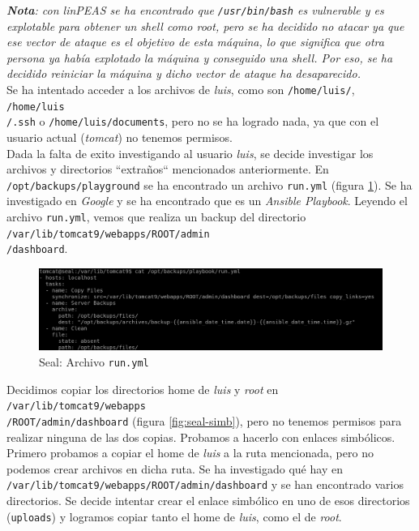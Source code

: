 \textit{\textbf{Nota}: con linPEAS se ha encontrado que \texttt{/usr/bin/bash} es vulnerable y es explotable para obtener un shell como root, pero se ha decidido no atacar ya que ese vector de ataque es el objetivo de esta máquina, lo que significa que otra persona ya había explotado la máquina y conseguido una shell. Por eso, se ha decidido reiniciar la máquina y dicho vector de ataque ha desaparecido.}\\

Se ha intentado acceder a los archivos de \textit{luis}, como son \texttt{/home/luis/}, \texttt{/home/luis\\/.ssh} o \texttt{/home/luis/documents}, pero no se ha logrado nada, ya que con el usuario actual (\textit{tomcat}) no tenemos permisos.\\

Dada la falta de exito investigando al usuario \textit{luis}, se decide investigar los archivos y directorios ``extraños`` mencionados anteriormente. En \texttt{/opt/backups/playground} se ha encontrado un archivo \texttt{run.yml} (figura \ref{fig:seal-run}). Se ha investigado en \textit{Google} y se ha encontrado que es un \textit{Ansible Playbook}\cite{ansible-playbooks}. Leyendo el archivo \texttt{run.yml}, vemos que realiza un backup del directorio \texttt{/var/lib/tomcat9/webapps/ROOT/admin\\/dashboard}.\\

\begin{figure}[h]
    \centering
    \includegraphics[width=1.0\textwidth]{images/machines/seal/run-yml.png}
    \caption{Seal: Archivo \texttt{run.yml}}
    \label{fig:seal-run}
\end{figure}

Decidimos copiar los directorios home de \textit{luis} y \textit{root} en \texttt{/var/lib/tomcat9/webapps\\/ROOT/admin/dashboard} (figura \ref{fig:seal-simb}), pero no tenemos permisos para realizar ninguna de las dos copias. Probamos a hacerlo con enlaces simbólicos. Primero probamos a copiar el home de \textit{luis} a la ruta mencionada, pero no podemos crear archivos en dicha ruta. Se ha investigado qué hay en \texttt{/var/lib/tomcat9/webapps/ROOT/admin/dashboard} y se han encontrado varios directorios. Se decide intentar crear el enlace simbólico en uno de esos directorios (\texttt{uploads}) y logramos copiar tanto el home de \textit{luis}, como el de \textit{root}.


